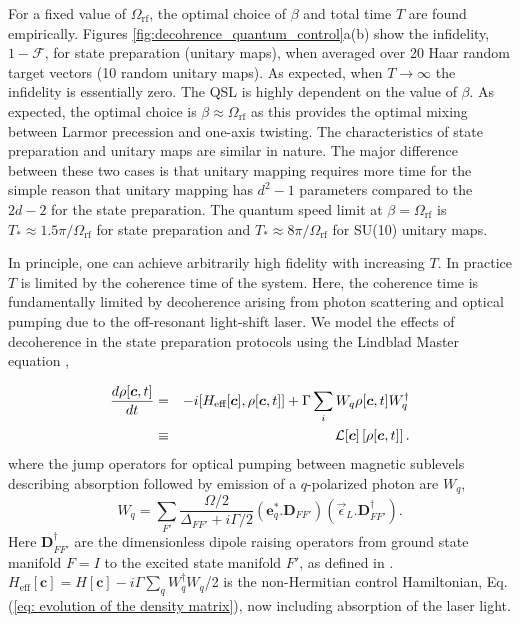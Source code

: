 \documentclass[aps,prl,twocolumn,reprint,superscriptaddress,footinbib]{revtex4-2}
\begin{document}
For a fixed value of $\Omega_\text{rf}$, the optimal choice of $\beta$ and total time $T$ are found empirically. Figures \ref{fig:decohrence_quantum_control}a(b) show the infidelity, $1-\mathcal{F}$, for state preparation (unitary maps), when averaged over 20 Haar random target vectors (10 random unitary maps).   As expected, when $T \rightarrow \infty$ the infidelity is essentially zero. The QSL is highly dependent on the value of $\beta$.
As expected, the optimal choice is $\beta \approx \Omega_\text{rf}$ as this provides the optimal mixing between Larmor precession and one-axis twisting.  The characteristics of state preparation and unitary maps are  similar in nature. The major difference between these two cases is that unitary mapping requires more time for the simple reason that unitary mapping has $d^2-1$ parameters compared to the $2d-2$ for the state preparation.  The quantum speed limit at $\beta=\Omega_{\mathrm{rf}}$ is $T_* \approx 1.5 \pi/\Omega_{\mathrm{rf}}$ for state preparation and $T_* \approx 8 \pi/\Omega_{\mathrm{rf}}$ for SU(10) unitary maps.
 
In principle, one can achieve arbitrarily high fidelity with increasing $T$.  In practice $T$ is limited by the coherence time of the system.  Here, the coherence time is fundamentally limited by decoherence arising from photon scattering and optical pumping due to the off-resonant light-shift laser.  
We model the effects of decoherence in the state preparation protocols using the Lindblad Master equation \cite{deutsch2010quantum},

\begin{eqnarray}
\frac{d\rho[\bm{c}, t]}{dt} &=&-i \comm{H_\text{eff}[\bm{c}]}{\rho[\bm{c},t]}+ \Gamma\sum_{i}W_q\rho[\bm{c},t] W_{q}^{\dagger}  \nonumber \\ 
&\equiv& \mathcal{L}[\bm{c}]\left[ \rho[\bm{c},t]\right].
\label{eq: evolution of the density matrix}
\end{eqnarray}
where the jump operators for optical pumping between magnetic sublevels describing absorption followed by emission of a $q$-polarized photon are $W_q$,
\begin{equation}
W_q=\sum_{F'}\frac{\Omega/2}{\Delta_{FF'}+i\Gamma/2}(\bm{e}_q^{*}.\bm{D}_{FF'})(\vec{\epsilon}_L.\bm{D}_{FF'}^{\dagger}).
\end{equation}
Here $\bm{D}_{FF'}^{\dagger}$ are the dimensionless dipole raising operators from ground state manifold $F=I$ to the excited state manifold $F'$, as defined in \cite{deutsch2010quantum}. $H_\text{eff}[\mathbf{c}] = H[\mathbf{c}] -i\Gamma \sum_q W_q^\dag W_q$/2 is the non-Hermitian control Hamiltonian, Eq. (\ref{eq: evolution of the density matrix}), now including absorption of the laser light.  
\end{document}
